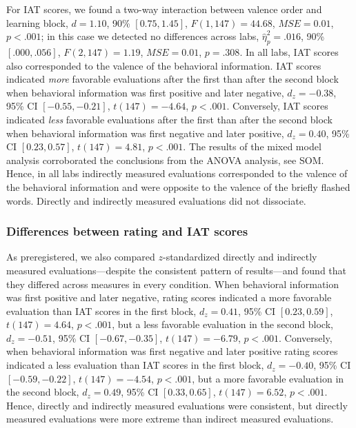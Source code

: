 \documentclass[
  man,floatsintext]{apa6}
\begin{document}
For IAT scores, we found a two-way interaction between valence order and learning block, \(d = 1.10\), 90\% \([0.75, 1.45]\), \(F(1, 147) = 44.68\), \(\mathit{MSE} = 0.01\), \(p < .001\); in this case we detected no differences across labs, \(\hat\eta^2_p = .016\), 90\% \([.000, .056]\), \(F(2, 147) = 1.19\), \(\mathit{MSE} = 0.01\), \(p = .308\).
In all labs, IAT scores also corresponded to the valence of the behavioral information.
IAT scores indicated \emph{more} favorable evaluations after the first than after the second block when behavioral information was first positive and later negative, \(d_z = -0.38\), 95\% CI \([-0.55, -0.21]\), \(t(147) = -4.64\), \(p < .001\).
Conversely, IAT scores indicated \emph{less} favorable evaluations after the first than after the second block when behavioral information was first negative and later positive, \(d_z = 0.40\), 95\% CI \([0.23, 0.57]\), \(t(147) = 4.81\), \(p < .001\).
The results of the mixed model analysis corroborated the conclusions from the ANOVA analysis, see SOM.
Hence, in all labs indirectly measured evaluations corresponded to the valence of the behavioral information and were opposite to the valence of the briefly flashed words.
Directly and indirectly measured evaluations did not dissociate.

\hypertarget{differences-between-rating-and-iat-scores}{%
\subsubsection{Differences between rating and IAT scores}\label{differences-between-rating-and-iat-scores}}

As preregistered, we also compared \(z\)-standardized directly and indirectly measured evaluations---despite the consistent pattern of results---and found that they differed across measures in every condition.
When behavioral information was first positive and later negative, rating scores indicated a more favorable evaluation than IAT scores in the first block, \(d_z = 0.41\), 95\% CI \([0.23, 0.59]\), \(t(147) = 4.64\), \(p < .001\), but a less favorable evaluation in the second block, \(d_z = -0.51\), 95\% CI \([-0.67, -0.35]\), \(t(147) = -6.79\), \(p < .001\).
Conversely, when behavioral information was first negative and later positive rating scores indicated a less evaluation than IAT scores in the first block, \(d_z = -0.40\), 95\% CI \([-0.59, -0.22]\), \(t(147) = -4.54\), \(p < .001\), but a more favorable evaluation in the second block, \(d_z = 0.49\), 95\% CI \([0.33, 0.65]\), \(t(147) = 6.52\), \(p < .001\).
Hence, directly and indirectly measured evaluations were consistent, but directly measured evaluations were more extreme than indirect measured evaluations.
\end{document}
